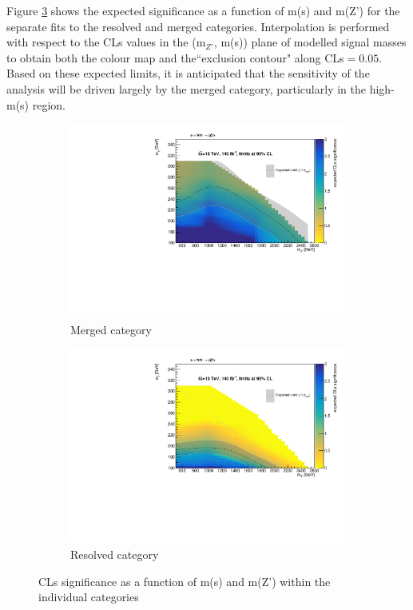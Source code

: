 \documentclass[12pt]{article}
\begin{document}
Figure \ref{fig:sensitivity_categories} shows the expected significance as a function of m(s) and m(Z') for the separate fits to the resolved and merged categories. Interpolation is performed with respect to the CLs values in the (m$_{Z'}$, m(s)) plane of modelled signal masses to obtain both the colour map and the``exclusion contour" along CLs$=0.05$. Based on these expected limits, it is anticipated that the sensitivity of the analysis will be driven largely by the merged category, particularly in the high-m(s) region. 

\begin{figure}[H]
     \centering
     \begin{subfigure}[b]{0.49\textwidth}
         \centering
         \includegraphics[width=\textwidth]{figures/exclude_combined_had_comparison_merged.pdf}
         \caption[]{Merged category}
         \label{fig:merged_sensitivity}
     \end{subfigure}
     \hfill
     \begin{subfigure}[b]{0.49\textwidth}
         \centering
         \includegraphics[width=\textwidth]{figures/exclude_combined_had_comparison_resolved.pdf}
         \caption[]{Resolved category}
         \label{fig:resolved_sensitivity}
     \end{subfigure}
\caption[]{CLs significance as a function of m(s) and m(Z') within the individual categories}
\label{fig:sensitivity_categories}
\end{figure}
\end{document}

